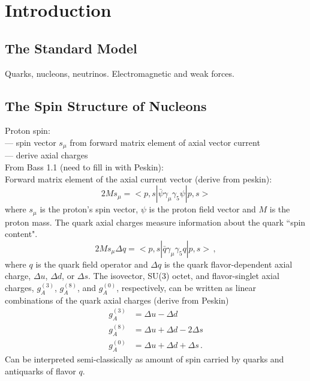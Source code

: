 \section{Introduction} \label{sec:intro}
\hspace{\parindent}

\subsection{The Standard Model}\label{sec:standardmodel}

Quarks, nucleons, neutrinos. Electromagnetic and weak forces.


\subsection{The Spin Structure of Nucleons} \label{sec:nuctheory}
  Proton spin: \\
  --- spin vector $s_{\mu}$ from forward matrix element of axial vector current \\
  --- derive axial charges \\
  From Bass 1.1 (need to fill in with Peskin): \\
  Forward matrix element of the axial current vector (derive from peskin):
  \[
      2Ms_{\mu} = <p,s|\bar{\psi}\gamma_{\mu} \gamma_{5} \psi|p,s>
  \]
  where $s_{\mu}$ is the proton's spin vector, $\psi$ is the proton field
  vector and $M$ is the proton mass. The quark axial charges measure
  information about the quark ``spin content".
  \[
    2Ms_{\mu}\Delta q = <p,s| \bar{q}\gamma_{\mu}\gamma_{5}q|p,s> \,,
  \]
  where $q$ is the quark field operator and $\Delta q$ is the quark
  flavor-dependent axial charge, $\Delta u$, $\Delta d$, or $\Delta s$. The
  isovector, SU(3) octet, and flavor-singlet axial charges, $g_A^{(3)}$,
  $g_A^{(8)}$, and $g_A^{(0)}$, respectively, can be written as linear
  combinations of the quark axial charges (derive from Peskin)
  \begin{align}
      g_A^{(3)} &= \Delta u - \Delta d \\
      g_A^{(8)} &= \Delta u + \Delta d - 2\Delta s \\
      g_A^{(0)} &= \Delta u + \Delta d + \Delta s \,.
  \end{align}
  Can be interpreted semi-classically as amount of spin carried by quarks and
  antiquarks of flavor $q$.

